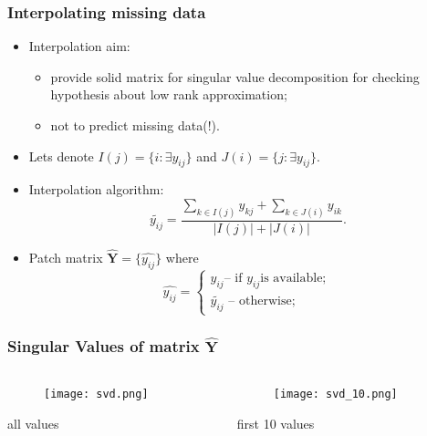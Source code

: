 \documentclass{beamer}
\newcommand{\mY}{\mathbf{Y}}
\begin{document}
\begin{frame}
\frametitle{Interpolating missing data}
\begin{itemize}
  \item Interpolation aim:
  \begin{itemize}
    \item provide solid matrix for singular value decomposition for checking
    hypothesis about low rank approximation;
    \item not to predict missing data(!). 
    \end{itemize}
    \item Lets denote $I(j) = \{i: \exists y_{ij}\}$ and $J(i) = \{j: \exists
    y_{ij}\}$.
    \item Interpolation algorithm:
    \begin{equation*}
    \tilde{y_{ij}} = \frac{\sum\limits_{k \in I(j)} y_{kj} + \sum\limits_{k \in J(i)}
    y_{ik}}{|I(j)| + |J(i)|}. 
    \end{equation*}
    \item Patch matrix $\hat{\mY} = \{\hat{y_{ij}} \}$ where
    \begin{equation*}
    \hat{y_{ij}} = 
    \begin{cases} 
     y_{ij} \text{-- if } y_{ij} \text{is available};\\
    \tilde{y_{ij}} \text{ -- otherwise};
    \end{cases}
    \end{equation*} 
\end{itemize}
\end{frame}

\begin{frame}
\frametitle{Singular Values of matrix $\hat{\mY}$}
\begin{columns}[T] %
\begin{column}{.48\textwidth}
\begin{figure}[h] 
    \texttt{[image: svd.png]}
\end{figure}
all values
\end{column}%
\hfill%
\begin{column}{.48\textwidth}
\begin{figure}[h] 
    \texttt{[image: svd\_10.png]}
\end{figure}
first 10 values
\end{column}%
\end{columns}
\end{frame}
\end{document}
